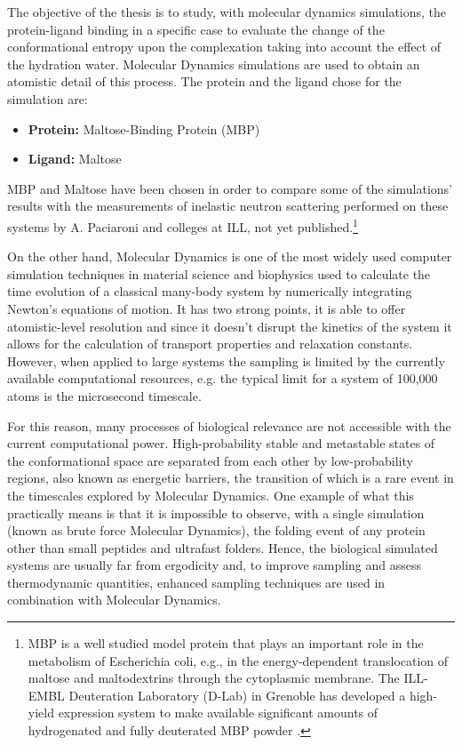 The objective of the thesis is to study, with molecular dynamics simulations, the protein-ligand binding in a specific case to evaluate the change of the conformational entropy upon the complexation taking into account the effect of the hydration water. Molecular Dynamics simulations are used to obtain an atomistic detail of this process.
The protein and the ligand chose for the simulation are:
\begin{center}
\begin{minipage}{0.7\textwidth}
\begin{itemize}
\item[] \textbf{Protein:} Maltose-Binding Protein (MBP)
\vspace{-0.2cm}
\item[] \textbf{Ligand:} Maltose
\end{itemize}
\end{minipage}
\end{center}
MBP and Maltose have been chosen in order to compare some of the simulations' results with the measurements of inelastic neutron scattering performed on these systems by A. Paciaroni and colleges at ILL, not yet published.\footnote{MBP is a well studied model protein that plays an important role in the metabolism of Escherichia coli, e.g., in the energy-dependent translocation of maltose and maltodextrins through the cytoplasmic membrane. The ILL-EMBL Deuteration Laboratory (D-Lab) in Grenoble has developed a high-yield expression system to make available significant amounts of hydrogenated and fully deuterated MBP powder
\cite{paciaroni2008fingerprints}.}

On the other hand, Molecular Dynamics is one of the most widely used computer simulation techniques in material science and biophysics used to calculate the time evolution of a classical many-body system by numerically integrating Newton's equations of motion. It has two strong points, it is able to offer atomistic-level resolution and since it doesn't disrupt the kinetics of the system it allows for the calculation of transport properties and relaxation constants. However, when applied to large systems the sampling is limited by the currently available computational resources, e.g. the typical limit for a system of 100,000 atoms is the microsecond timescale. 

For this reason, many processes of biological relevance are not accessible with the current computational power. High-probability stable and metastable states of the conformational space are separated from each other by low-probability regions, also known as energetic barriers, the transition of which is a rare event in the timescales explored by Molecular Dynamics. One example of what this practically means is that it is impossible to observe, with a single simulation (known as brute force Molecular Dynamics), the folding event of any protein other than small peptides and ultrafast folders. Hence, the biological simulated systems are usually far from ergodicity and, to improve sampling and assess thermodynamic quantities, enhanced sampling techniques are used in combination with Molecular Dynamics.\cite{kalimeri}

